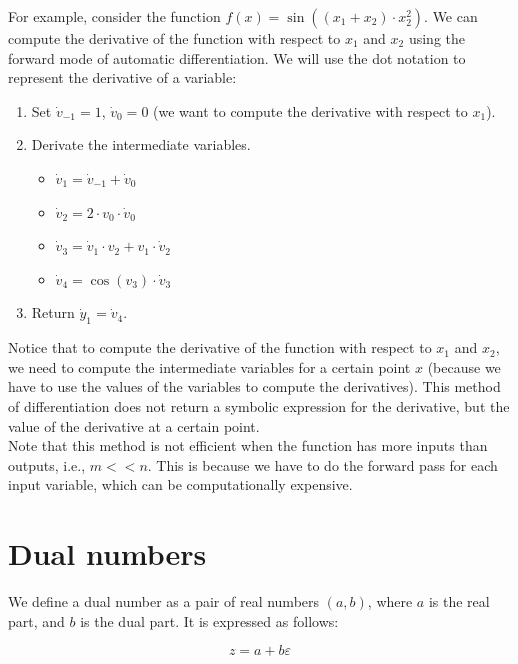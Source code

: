 For example, consider the function $f(x) = \sin((x_1 + x_2) \cdot x_2^2)$. We can compute
the derivative of the function with respect to $x_1$ and $x_2$ using the forward mode of automatic differentiation.
We will use the dot notation to represent the derivative of a variable:

\begin{enumerate}
    \item Set $\dot{v}_{-1} = 1$, $\dot{v}_0 = 0$ (we want to compute the derivative with respect to $x_1$).
    \item Derivate the intermediate variables. 
    
    \begin{itemize}
        \item $\dot{v}_{1} = \dot{v}_{-1} + \dot{v}_0$
        \item $\dot{v}_{2} = 2 \cdot v_0 \cdot \dot{v}_0$
        \item $\dot{v}_{3} = \dot{v}_1 \cdot v_2 + v_1 \cdot \dot{v}_2$
        \item $\dot{v}_{4} = \cos(v_3) \cdot \dot{v}_3$
    \end{itemize}

    \item Return $\dot{y}_1 = \dot{v}_4$.

\end{enumerate}

Notice that to compute the derivative of the function with respect to $x_1$ and $x_2$, we need to
compute the intermediate variables for a certain point $x$ (because we have to use the values of the variables
to compute the derivatives). This method of differentiation does not return a symbolic 
expression for the derivative, but the value of the derivative at a certain point.\\

Note that this method is not efficient when the function has more inputs than outputs, i.e., $m << n$.
This is because we have to do the forward pass for each input variable, which can be computationally expensive.

\section{Dual numbers}

We define a dual number as a pair of real numbers $(a, b)$, where $a$ is the real part, and $b$ is the dual part.
It is expressed as follows:

\begin{equation}
    z = a + b \varepsilon
\end{equation}

